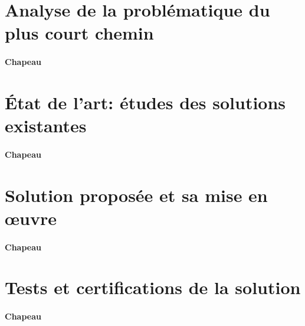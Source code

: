 \section{Analyse de la problématique du plus court chemin} \label{sec:ProblematiquePlusCourtChemin}

\paragraph{Chapeau}


\section{État de l’art: études des solutions existantes} \label{sec:etatDeLart1}

\paragraph{Chapeau}


\section{Solution proposée et sa mise en œuvre} \label{sec:solution1}

\paragraph{Chapeau}


\section{Tests et certifications de la solution} \label{sec:test1}

\paragraph{Chapeau}
